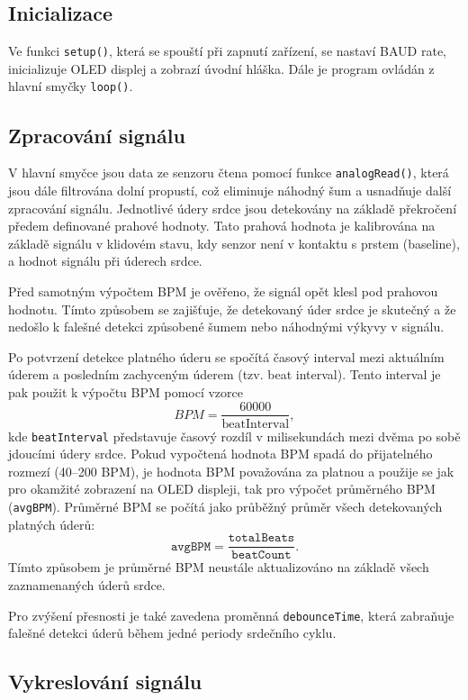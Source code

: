 \documentclass[11pt,a4paper]{article}
\begin{document}
\subsection{Inicializace}
Ve funkci \texttt{setup()}, která se spouští při zapnutí zařízení, se nastaví BAUD rate, inicializuje OLED displej a zobrazí úvodní hláška. Dále je program ovládán z hlavní smyčky \texttt{loop()}. 

\subsection{Zpracování signálu}

V hlavní smyčce jsou data ze senzoru čtena pomocí funkce \texttt{analogRead()}, která jsou dále filtrována dolní propustí, což eliminuje náhodný šum a usnadňuje další zpracování signálu. Jednotlivé údery srdce jsou detekovány na základě překročení předem definované prahové hodnoty. Tato prahová hodnota je kalibrována na základě signálu v klidovém stavu, kdy senzor není v kontaktu s prstem (baseline), a hodnot signálu při úderech srdce.

Před samotným výpočtem BPM je ověřeno, že signál opět klesl pod prahovou hodnotu. Tímto způsobem se zajišťuje, že detekovaný úder srdce je skutečný a že nedošlo k falešné detekci způsobené šumem nebo náhodnými výkyvy v signálu.

Po potvrzení detekce platného úderu se spočítá časový interval mezi aktuálním úderem a posledním zachyceným úderem (tzv. beat interval). Tento interval je pak použit k výpočtu BPM pomocí vzorce
\[
BPM = \frac{60000}{\text{beatInterval}},
\]
kde \texttt{beatInterval} představuje časový rozdíl v milisekundách mezi dvěma po sobě jdoucími údery srdce. Pokud vypočtená hodnota BPM spadá do přijatelného rozmezí (40--200 BPM), je hodnota BPM považována za platnou a použije se jak pro okamžité zobrazení na OLED displeji, tak pro výpočet průměrného BPM (\texttt{avgBPM}). Průměrné BPM se počítá jako průběžný průměr všech detekovaných platných úderů:
\[
\texttt{avgBPM} = \frac{\texttt{totalBeats}}{\texttt{beatCount}}.
\]
Tímto způsobem je průměrné BPM neustále aktualizováno na základě všech zaznamenaných úderů srdce.

Pro zvýšení přesnosti je také zavedena proměnná \texttt{debounceTime}, která zabraňuje falešné detekci úderů během jedné periody srdečního cyklu.


\subsection{Vykreslování signálu}
\end{document}
